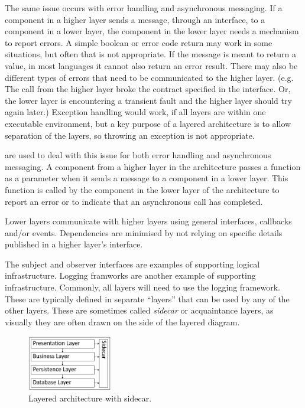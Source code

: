 The same issue occurs with error handling and asynchronous messaging.
If a component in a higher layer sends a message, through an interface, to a component in a lower layer,
the component in the lower layer needs a mechanism to report errors.
A simple boolean or error code return may work in some situations, but often that is not appropriate.
If the message is meant to return a value, in most languages it cannot also return an error result.
There may also be different types of errors that need to be communicated to the higher layer.
(e.g. The call from the higher layer broke the contract specified in the interface.
Or, the lower layer is encountering a transient fault and the higher layer should try again later.)
Exception handling would work, if all layers are within one executable environment,
but a key purpose of a layered architecture is to allow separation of the layers,
so throwing an exception is not appropriate.

are used to deal with this issue for both error handling and asynchronous messaging.
A component from a higher layer in the architecture passes a function as a parameter when it sends a message to a component in a lower layer.
This function is called by the component in the lower layer of the architecture to report an error
or to indicate that an asynchronous call has completed.

\begin{definition}
    Lower layers communicate with higher layers using general interfaces, callbacks and/or events.
    Dependencies are minimised by not relying on specific details published in a higher layer's interface.
\end{definition}

The subject and observer interfaces are examples of supporting logical infrastructure.
Logging framworks are another example of supporting infrastructure.
Commonly, all layers will need to use the logging framework.
These are typically defined in separate ``layers'' that can be used by any of the other layers.
These are sometimes called \emph{sidecar} or acquaintance layers, as visually they are often drawn on the side of the layered diagram.

\begin{figure}[h]
  \begin{center}
    \includegraphics[width=0.33\textwidth]{images/layered_with_sidecar.png}
  \end{center}
  \caption{Layered architecture with sidecar.}
\end{figure}

